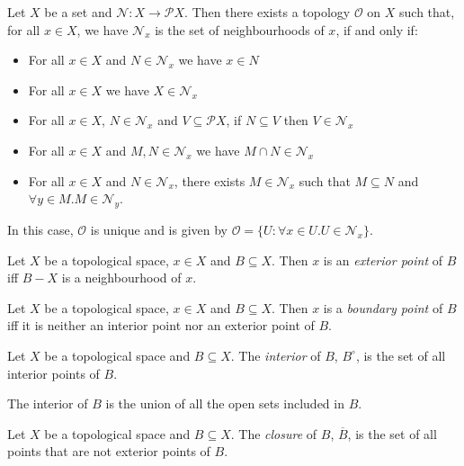\begin{prop}
Let $X$ be a set and $\mathcal{N} : X \rightarrow \mathcal{P} X$. Then there exists a topology $\mathcal{O}$ on $X$ such that, for all $x \in X$, we have $\mathcal{N}_x$ is the set of neighbourhoods of $x$, if and only if:
\begin{itemize}
\item For all $x \in X$ and $N \in \mathcal{N}_x$ we have $x \in N$
\item For all $x \in X$ we have $X \in \mathcal{N}_x$
\item For all $x \in X$, $N \in \mathcal{N}_x$ and $V \subseteq \mathcal{P} X$, if $N \subseteq V$ then $V \in \mathcal{N}_x$
\item For all $x \in X$ and $M, N \in \mathcal{N}_x$ we have $M \cap N \in \mathcal{N}_x$
\item For all $x \in X$ and $N \in \mathcal{N}_x$, there exists $M \in \mathcal{N}_x$ such that $M \subseteq N$ and $\forall y \in M. M \in \mathcal{N}_y$.
\end{itemize}
In this case, $\mathcal{O}$ is unique and is given by $\mathcal{O} = \{ U : \forall x \in U. U \in \mathcal{N}_x \}$.
\end{prop}

\begin{df}
Let $X$ be a topological space, $x \in X$ and $B \subseteq X$. Then $x$ is an \emph{exterior point} of $B$ iff $B - X$ is a neighbourhood of $x$.
\end{df}

\begin{df}
Let $X$ be a topological space, $x \in X$ and $B \subseteq X$. Then $x$ is a \emph{boundary point} of $B$ iff it is neither an interior point nor an exterior point of $B$.
\end{df}

\begin{df}[Interior]
Let $X$ be a topological space and $B \subseteq X$. The \emph{interior} of $B$, $B^\circ$, is the set of all interior points of $B$.
\end{df}

\begin{prop}
The interior of $B$ is the union of all the open sets included in $B$.
\end{prop}

\begin{df}[Closure]
Let $X$ be a topological space and $B \subseteq X$. The \emph{closure} of $B$, $\overline{B}$, is the set of all points that are not exterior points of $B$.
\end{df}

